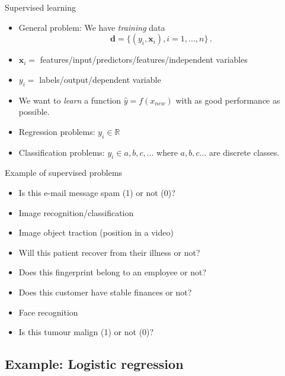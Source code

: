 \documentclass[10pt,handout]{beamer}
\begin{document}
\begin{frame}{Supervised learning}

\begin{itemize}
\item General problem: We have \emph{training} data
\[
\mathbf{d} = \{(y_i, \mathbf{x}_i), i = 1, ..., n\} \,.
\]
\item $\mathbf{x}_i = $ features/input/predictors/features/independent variables
\item $y_i = $ labels/output/dependent variable
\item We want to \emph{learn} a function $\hat{y} = f(x_{new})$ with as good performance as possible.\pause
\item Regression problems: $y_i \in \mathbb{R}$
\item Classification problems: $y_i \in {a,b,c,...}$ where $a,b,c ...$ are discrete classes.
\end{itemize}

\end{frame}



\begin{frame}{Example of supervised problems}


\begin{itemize}
\item Is this e-mail message spam (1) or not (0)?\pause
\item Image recognition/classification\pause
\item Image object traction (position in a video)\pause
\item Will this patient recover from their illness or not?\pause
\item Does this fingerprint belong to an employee or not?\pause
\item Does this customer have stable finances or not?\pause
\item Face recognition\pause
\item Is this tumour malign (1) or not (0)?\pause
\end{itemize}

\end{frame}


\subsection{Example: Logistic regression}
\end{document}
